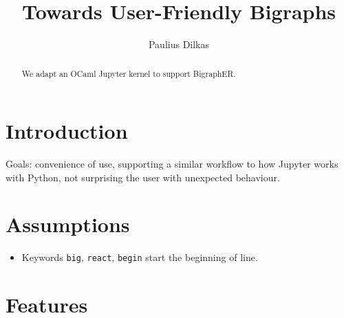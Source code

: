 \documentclass{article}
\author{Paulius Dilkas}
\title{Towards User-Friendly Bigraphs}
\begin{document}
\maketitle

\begin{abstract}
  We adapt an OCaml Jupyter kernel to support BigraphER.
\end{abstract}

\section{Introduction}


Goals: convenience of use, supporting a similar workflow to how Jupyter works
with Python, not surprising the user with unexpected behaviour.

\section{Assumptions}

\begin{itemize}
\item Keywords \texttt{big}, \texttt{react}, \texttt{begin} start the beginning
  of line.
\end{itemize}

\section{Features}
\end{document}
